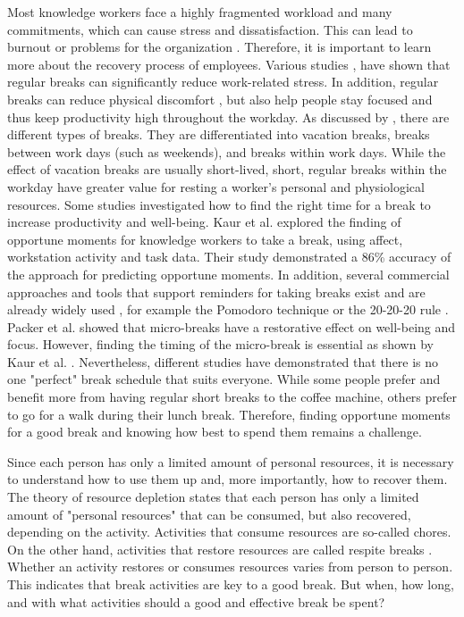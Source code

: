 \documentclass{hasel_thesis}
\begin{document}
Most knowledge workers face a highly fragmented workload and many commitments, which can cause stress and dissatisfaction. This can lead to burnout or problems for the organization \cite{Elkin.1990}. Therefore, it is important to learn more about the recovery process of employees. Various studies \cite{Largo-Wight.2017},\cite{KimS.ParkY.&Niu.2017} have shown that regular breaks can significantly reduce work-related stress.  In addition, regular breaks can reduce physical discomfort \cite{Waongenngarm.2018}, but also help people stay focused \cite{Ariga.2011} \cite{Bloom.2014} and thus keep productivity high throughout the workday. As discussed by \cite{Trougakos.2009}, there are different types of breaks. They are differentiated into vacation breaks, breaks between work days (such as weekends), and breaks within work days. While the effect of vacation breaks are usually short-lived, short, regular breaks within the workday have greater value for resting a worker's personal and physiological resources.
Some studies investigated how to find the right time for a break to increase productivity and well-being. Kaur et al. \cite{Kaur.2020} explored the finding of opportune moments for knowledge workers to take a break, using affect, workstation activity and task data. Their study demonstrated a 86\% accuracy of the approach for predicting opportune moments. In addition, several commercial approaches and tools that support reminders for taking breaks exist and are already widely used \cite{Alghamdi.2020}, for example the Pomodoro technique \cite{Cirillo.2006} or the 20-20-20 rule \cite{Min.2019}. Packer et al. \cite{Packer.2021} showed that micro-breaks have a restorative effect on well-being and focus.  However, finding the timing of the micro-break is essential as shown by Kaur et al. \cite{Kaur.2020}. Nevertheless, different studies \cite{KimS.ParkY.&Niu.2017} \cite{Berman.2007} have demonstrated that there is no one "perfect" break schedule that suits everyone. While some people prefer and benefit more from having regular short breaks to the coffee machine, others prefer to go for a walk during their lunch break. Therefore, finding opportune moments for a good break and knowing how best to spend them remains a challenge. 

Since each person has only a limited amount of personal resources, it is necessary to understand how to use them up and, more importantly, how to recover them. The theory of resource depletion \cite{BaumeisterR.F.BratslavskyE.MuravenM.&TiceD.M..1998} states that each person has only a limited amount of "personal resources" that can be consumed, but also recovered, depending on the activity. Activities that consume resources are so-called chores. On the other hand, activities that restore resources are called respite breaks \cite{Trougakos.2009}. Whether an activity restores or consumes resources varies from person to person. This indicates that break activities are key to a good break. But when, how long, and with what activities should a good and effective break be spent? 
\end{document}
